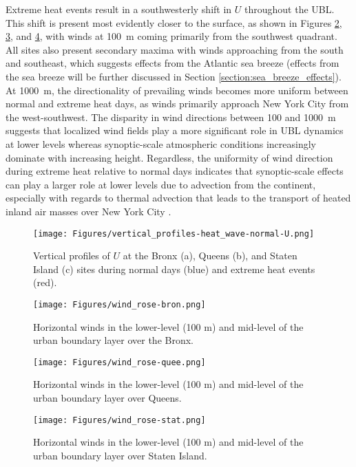 Extreme heat events result in a southwesterly shift in $U$ throughout the UBL. This shift is present most evidently closer to the surface, as shown in Figures \ref{fig:wind_rose-bron}, \ref{fig:wind_rose-quee}, and \ref{fig:wind_rose-stat}, with winds at \SI{100}{\meter} coming primarily from the southwest quadrant. All sites also present secondary maxima with winds approaching from the south and southeast, which suggests effects from the Atlantic sea breeze (effects from the sea breeze will be further discussed in Section \ref{section:sea_breeze_effects}). At \SI{1000}{\meter}, the directionality of prevailing winds becomes more uniform between normal and extreme heat days, as winds primarily approach New York City from the west-southwest. The disparity in wind directions between 100 and \SI{1000}{\meter} suggests that localized wind fields play a more significant role in UBL dynamics at lower levels whereas synoptic-scale atmospheric conditions increasingly dominate with increasing height. Regardless, the uniformity of wind direction during extreme heat relative to normal days indicates that synoptic-scale effects can play a larger role at lower levels due to advection from the continent, especially with regards to thermal advection that leads to the transport of heated inland air masses over New York City \citep{jiang2019, ramamurthy2017b}.


\begin{figure}[ht]
	\centering
	\texttt{[image: Figures/vertical\_profiles-heat\_wave-normal-U.png]}
	\caption{Vertical profiles of $U$ at the Bronx (a), Queens (b), and Staten Island (c) sites during normal days (blue) and extreme heat events (red).}
	\label{fig:vertical_profiles-heat_wave-normal-U}
\end{figure}

\begin{figure}[ht]
	\texttt{[image: Figures/wind\_rose-bron.png]}
	\caption{Horizontal winds in the lower-level (100 m) and mid-level of the urban boundary layer over the Bronx.}
	\label{fig:wind_rose-bron}
\end{figure}
\begin{figure}[ht]
	\centering
	\texttt{[image: Figures/wind\_rose-quee.png]}
	\caption{Horizontal winds in the lower-level (100 m) and mid-level of the urban boundary layer over Queens.}
	\label{fig:wind_rose-quee}
\end{figure}
\begin{figure}[ht]
	\centering
	\texttt{[image: Figures/wind\_rose-stat.png]}
	\caption{Horizontal winds in the lower-level (100 m) and mid-level of the urban boundary layer over Staten Island.}
	\label{fig:wind_rose-stat}
\end{figure}

